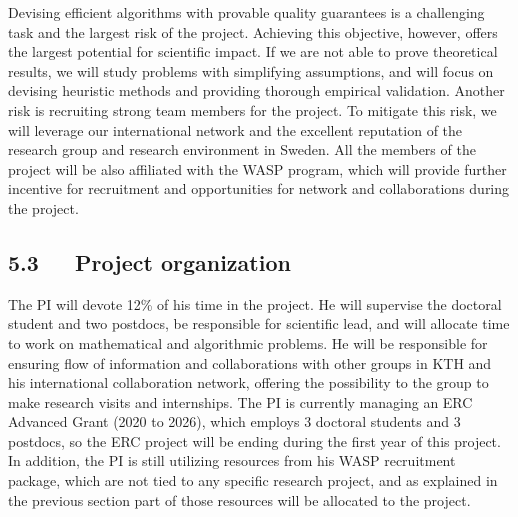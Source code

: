 \documentclass[a4paper,11pt]{article}
\begin{document}
Devising efficient algorithms with provable quality guarantees is a challenging task
and the largest risk of the project. 
Achieving this objective, however, offers the largest potential for scientific impact.
If we are not able to prove theoretical results, 
we will study problems with simplifying assumptions, and 
will focus on devising heuristic methods and providing thorough empirical validation.
Another risk is recruiting strong team members for the project. 
To mitigate this risk, we will leverage our international network
and the excellent reputation of the research group and research environment in Sweden. 
All the members of the project will be also affiliated with the WASP program, 
which will provide further incentive for recruitment and opportunities 
for network and collaborations during the project.


\subsection*{5.3~~~Project organization}


The PI will devote 12\% of his time in the project. 
He will supervise the doctoral student and two postdocs, 
be responsible for scientific lead, 
and will allocate time to work on mathematical and algorithmic problems.
He will be responsible for ensuring flow of information and collaborations
with other groups in KTH and his international collaboration network, 
offering the possibility to the group to make research visits and internships.
The PI is currently managing an ERC Advanced Grant (2020 to 2026),
which employs 3 doctoral students and 3 postdocs, 
so the ERC project will be ending during the first year of this project. 
In addition, the PI is still utilizing resources from his WASP recruitment package, 
which are not tied to any specific research project, 
and as explained in the previous section part of those resources will be allocated to the {\acronym} project.
\end{document}
